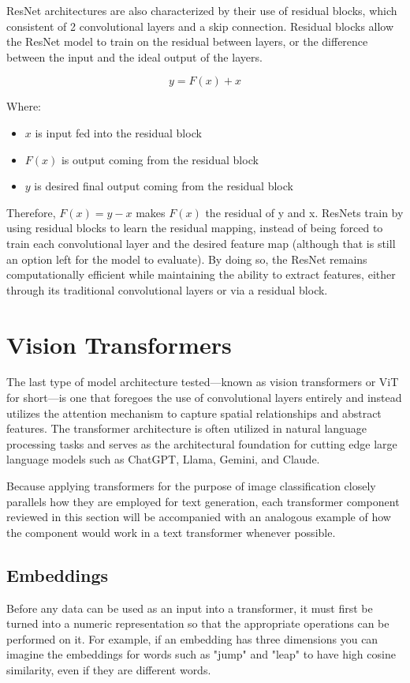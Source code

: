 \documentclass [MS] {uclathes}
\begin{document}
ResNet architectures are also characterized by their use of residual blocks, which consistent of 2 convolutional layers 
and a skip connection. Residual blocks allow the ResNet model to train on the residual between layers, or the difference 
between the input and the ideal output of the layers. 

\[y = F(x) + x\]

Where:
\begin{itemize}
    \item \(x\) is input fed into the residual block
    \item \(F(x)\) is output coming from the residual block
    \item \(y\) is desired final output coming from the residual block
\end{itemize}

Therefore, \(F(x) = y - x\) makes \(F(x)\) the residual of y and x. ResNets train by using residual blocks to learn the 
residual mapping, instead of being forced to train each convolutional layer and the desired feature map (although that 
is still an option left for the model to evaluate). By doing so, the ResNet remains computationally efficient while 
maintaining the ability to extract features, either through its traditional convolutional layers or via a residual 
block. 

\section{Vision Transformers}
The last type of model architecture tested---known as vision transformers or ViT for short---is one that foregoes the 
use of convolutional layers entirely and instead utilizes the attention mechanism to capture spatial relationships and 
abstract features. The transformer architecture is often utilized in natural language processing tasks and serves as the 
architectural foundation for cutting edge large language models such as ChatGPT, Llama, Gemini, and Claude. 

Because applying transformers for the purpose of image classification closely parallels how they are employed for text
generation, each transformer component reviewed in this section will be accompanied with an analogous example of how the
component would work in a text transformer whenever possible.

\subsection{Embeddings}
Before any data can be used as an input into a transformer, it must first be turned into a numeric representation so 
that the appropriate operations can be performed on it. For example, if an embedding has three dimensions you can 
imagine the embeddings for words such as "jump" and "leap" to have high cosine similarity, even if they are different 
words.
\end{document}
